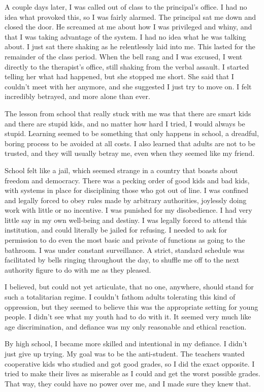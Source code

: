 A couple days later, I was called out of class to the principal's office. I had no idea what provoked this, so I was fairly alarmed. The principal sat me down and closed the door. He screamed at me about how I was privileged and whiny, and that I was taking advantage of the system. I had no idea what he was talking about. I just sat there shaking as he relentlessly laid into me. This lasted for the remainder of the class period. When the bell rang and I was excused, I went directly to the therapist's office, still shaking from the verbal assault. I started telling her what had happened, but she stopped me short. She said that I couldn't meet with her anymore, and she suggested I just try to move on. I felt incredibly betrayed, and more alone than ever.

The lesson from school that really stuck with me was that there are smart kids and there are stupid kids, and no matter how hard I tried, I would always be stupid. Learning seemed to be something that only happens in school, a dreadful, boring process to be avoided at all costs. I also learned that adults are not to be trusted, and they will usually betray me, even when they seemed like my friend.

School felt like a jail, which seemed strange in a country that boasts about freedom and democracy. There was a pecking order of good kids and bad kids, with systems in place for disciplining those who got out of line. I was confined and legally forced to obey rules made by arbitrary authorities, joylessly doing work with little or no incentive. I was punished for my disobedience. I had very little say in my own well-being and destiny. I was legally forced to attend this institution, and could literally be jailed for refusing. I needed to ask for permission to do even the most basic and private of functions as going to the bathroom. I was under constant surveillance. A strict, standard schedule was facilitated by bells ringing throughout the day, to shuffle me off to the next authority figure to do with me as they pleased.

I believed, but could not yet articulate, that no one, anywhere, should stand for such a totalitarian regime. I couldn't fathom adults tolerating this kind of oppression, but they seemed to believe this was the appropriate setting for young people. I didn't see what my youth had to do with it. It seemed very much like age discrimination, and defiance was my only reasonable and ethical reaction.

By high school, I became more skilled and intentional in my defiance. I didn't just give up trying. My goal was to be the anti-student. The teachers wanted cooperative kids who studied and got good grades, so I did the exact opposite. I tried to make their lives as miserable as I could and get the worst possible grades. That way, they could have no power over me, and I made sure they knew that.

